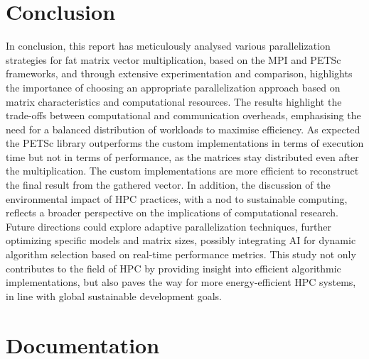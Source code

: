 \documentclass[12pt,oneside]{book} %
\begin{document}
\chapter{Conclusion}

In conclusion, this report has meticulously analysed various parallelization
strategies for fat matrix vector multiplication, based on the MPI and PETSc
frameworks, and through extensive experimentation and comparison, highlights
the importance of choosing an appropriate parallelization approach based on
matrix characteristics and computational resources. The results highlight the
trade-offs between computational and communication overheads, emphasising the
need for a balanced distribution of workloads to maximise efficiency. As
expected the PETSc library outperforms the custom implementations in terms of
execution time but not in terms of performance, as the matrices stay
distributed even after the multiplication. The custom implementations are more efficient to reconstruct the final result
from the gathered vector. In addition, the discussion of the environmental
impact of HPC practices, with a nod to sustainable computing, reflects a
broader perspective on the implications of computational research. Future
directions could explore adaptive parallelization techniques, further
optimizing specific models and matrix sizes, possibly integrating AI for
dynamic algorithm selection based on real-time performance metrics. This study
not only contributes to the field of HPC by providing insight into efficient
algorithmic implementations, but also paves the way for more energy-efficient
HPC systems, in line with global sustainable development goals.




\appendix
\chapter{Documentation}
\end{document}
